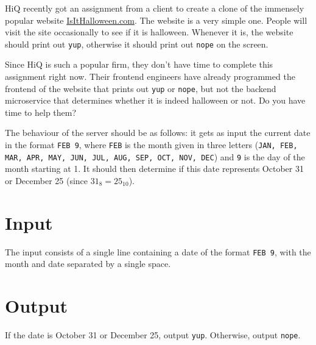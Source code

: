 
\noindent
HiQ recently got an assignment from a client to create a clone of the immensely popular website \url{IsItHalloween.com}.
The website is a very simple one.
People will visit the site occasionally to see if it is halloween.
Whenever it is, the website should print out \texttt{yup}, otherwise it should print out \texttt{nope} on the screen.

Since HiQ is such a popular firm, they don't have time to complete this assignment right now.
Their frontend engineers have already programmed the frontend of the website that prints out \texttt{yup} or \texttt{nope}, but not the backend microservice that determines whether it is indeed halloween or not.
Do you have time to help them?

The behaviour of the server should be as follows: it gets as input the current date in the format \texttt{FEB 9}, where \texttt{FEB} is the month given in three letters (\texttt{JAN, FEB, MAR, APR, MAY, JUN, JUL, AUG, SEP, OCT, NOV, DEC}) and \texttt{9} is the day of the month starting at 1.
It should then determine if this date represents October 31 or December 25 (since $31_8 = 25_{10}$).

\section*{Input}
The input consists of a single line containing a date of the format \texttt{FEB 9}, with the month and date separated by a single space.

\section*{Output}
If the date is October 31 or December 25, output \texttt{yup}.
Otherwise, output \texttt{nope}.
